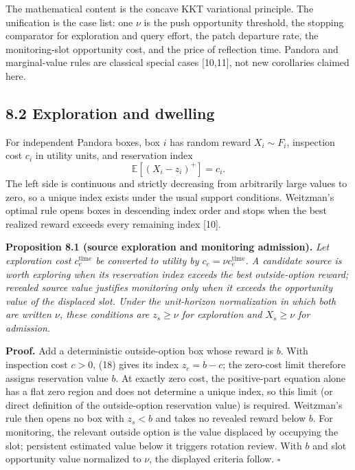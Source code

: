 \documentclass[
  11pt]{article}
\begin{document}
The mathematical content is the concave KKT variational principle. The unification is the case list: one \(\nu\) is the push opportunity threshold, the stopping comparator for exploration and query effort, the patch departure rate, the monitoring-slot opportunity cost, and the price of reflection time. Pandora and marginal-value rules are classical special cases {[}10,11{]}, not new corollaries claimed here.

\subsection{8.2 Exploration and dwelling}\label{exploration-and-dwelling}

For independent Pandora boxes, box \(i\) has random reward \(X_i\sim F_i\), inspection cost \(c_i\) in utility units, and reservation index \[
\mathbb E[(X_i-z_i)^+]=c_i.
\tag{18}
\] The left side is continuous and strictly decreasing from arbitrarily large values to zero, so a unique index exists under the usual support conditions. Weitzman's optimal rule opens boxes in descending index order and stops when the best realized reward exceeds every remaining index {[}10{]}.

\textbf{Proposition 8.1 (source exploration and monitoring admission).} \emph{Let exploration cost \(c_e^{\mathrm{time}}\) be converted to utility by \(c_e=\nu c_e^{\mathrm{time}}\). A candidate source is worth exploring when its reservation index exceeds the best outside-option reward; revealed source value justifies monitoring only when it exceeds the opportunity value of the displaced slot. Under the unit-horizon normalization in which both are written \(\nu\), these conditions are \(z_s\geq\nu\) for exploration and \(X_s\geq\nu\) for admission.}

\textbf{Proof.} Add a deterministic outside-option box whose reward is \(b\). With inspection cost \(c>0\), (18) gives its index \(z_c=b-c\); the zero-cost limit therefore assigns reservation value \(b\). At exactly zero cost, the positive-part equation alone has a flat zero region and does not determine a unique index, so this limit (or direct definition of the outside-option reservation value) is required. Weitzman's rule then opens no box with \(z_s<b\) and takes no revealed reward below \(b\). For monitoring, the relevant outside option is the value displaced by occupying the slot; persistent estimated value below it triggers rotation review. With \(b\) and slot opportunity value normalized to \(\nu\), the displayed criteria follow. \(\square\)
\end{document}
